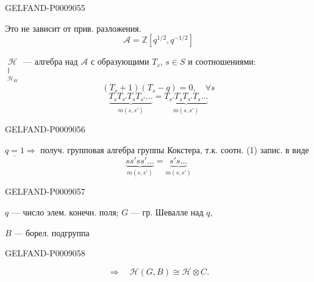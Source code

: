 \begin{GelfandAdjacentEvidence}{GELFAND-P000905}{5}


Это не зависит от прив. разложения.
\[
\mathcal A=\mathbb Z[q^{1/2},q^{-1/2}]
\]


$\underset{\substack{\Vert\\\mathcal H_W}}{\mathcal H}$ --- алгебра над $\mathcal A$ с образующими $T_s$, $s\in S$ и соотношениями:
\begin{equation*}
(T_s+1)(T_s-q)=0,\quad\forall s
\tag*{$(4)_1$}
\end{equation*}
\begin{equation*}
\underbrace{T_sT_{s'}T_sT_{s'}\ldots}_{m(s,s')}
=\underbrace{T_{s'}T_sT_{s'}T_s\ldots}_{m(s,s')}
\tag*{$(4)_2$}
\end{equation*}
\end{GelfandAdjacentEvidence}
\begin{GelfandAdjacentEvidence}{GELFAND-P000905}{6}


\(\underline{q=1}\Rightarrow\) получ. групповая алгебра группы Кокстера, т.к. соотн. (1) запис. в виде
\begin{equation*}
\underbrace{ss'ss'\ldots}_{m(s,s')}
=\underbrace{s's\ldots}_{m(s,s')}
\tag{5}
\end{equation*}
\end{GelfandAdjacentEvidence}
\begin{GelfandAdjacentEvidence}{GELFAND-P000905}{7}


$q$ --- число элем. конечн. поля; $G$ --- гр. Шевалле над $q$,

$B$ --- борел. подгруппа
\end{GelfandAdjacentEvidence}
\begin{GelfandAdjacentEvidence}{GELFAND-P000905}{8}


\[
\Rightarrow\quad \mathcal H(G,B)\cong\mathcal H\otimes C.
\]
\end{GelfandAdjacentEvidence}




